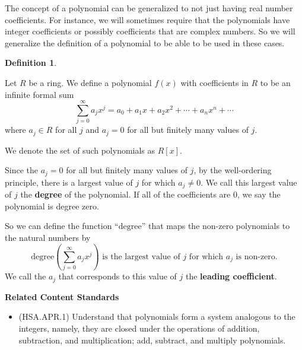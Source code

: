 \documentclass[
]{book}
\providecommand{\tightlist}{%
  \setlength{\itemsep}{0pt}\setlength{\parskip}{0pt}}
\newenvironment{standards}{}{}
\theoremstyle{definition}
\newtheorem{definition}{Definition}[chapter]
\theoremstyle{definition}
\theoremstyle{definition}
\theoremstyle{definition}
\theoremstyle{remark}
\begin{document}
The concept of a polynomial can be generalized to not just having real number coefficients. For instance, we will sometimes require that the polynomials have integer coefficients or possibly coefficients that are complex numbers. So we will generalize the definition of a polynomial to be able to be used in these cases.

\begin{definition}
\protect\hypertarget{def:unlabeled-div-112}{}\label{def:unlabeled-div-112}

Let \(R\) be a ring. We define a polynomial \(f(x)\) with coefficients in \(R\) to be an infinite formal sum \[\sum_{j=0}^\infty a_j x^j = a_0 + a_1 x+ a_2 x^2 + \cdots + a_n x^n + \cdots\] where \(a_j\in R\) for all \(j\) and \(a_j =0\) for all but finitely many values of \(j\).

We denote the set of such polynomials as \(R[x]\).

\end{definition}

Since the \(a_j=0\) for all but finitely many values of \(j\), by the well-ordering principle, there is a largest value of \(j\) for which \(a_j \neq 0\). We call this largest value of \(j\) the \textbf{degree} of the polynomial. If all of the coefficients are \(0\), we say the polynomial is degree zero.

So we can define the function ``\(\mathrm{degree}\)'' that maps the non-zero polynomials to the natural numbers by
\[\mathrm{degree}\left(\sum_{j=0}^\infty a_j x^j\right) \mbox{ is the largest value of $j$ for which $a_j$ is non-zero}.\] We call the \(a_j\) that corresponds to this value of \(j\) the \textbf{leading coefficient}.

\begin{standards}

\begin{center}
\textbf{Related Content Standards}

\end{center}

\begin{itemize}
\tightlist
\item
  (HSA.APR.1) Understand that polynomials form a system analogous to the integers, namely, they are closed under the operations of addition, subtraction, and multiplication; add, subtract, and multiply polynomials.
\end{itemize}

\end{standards}
\end{document}
